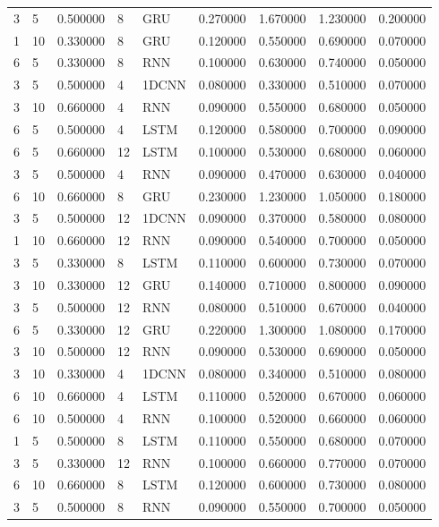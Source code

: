 \begin{tabular}{llrllrrrr}
3 & 5 & 0.500000 & 8 & GRU & 0.270000 & 1.670000 & 1.230000 & 0.200000 \\
1 & 10 & 0.330000 & 8 & GRU & 0.120000 & 0.550000 & 0.690000 & 0.070000 \\
6 & 5 & 0.330000 & 8 & RNN & 0.100000 & 0.630000 & 0.740000 & 0.050000 \\
3 & 5 & 0.500000 & 4 & 1DCNN & 0.080000 & 0.330000 & 0.510000 & 0.070000 \\
3 & 10 & 0.660000 & 4 & RNN & 0.090000 & 0.550000 & 0.680000 & 0.050000 \\
6 & 5 & 0.500000 & 4 & LSTM & 0.120000 & 0.580000 & 0.700000 & 0.090000 \\
6 & 5 & 0.660000 & 12 & LSTM & 0.100000 & 0.530000 & 0.680000 & 0.060000 \\
3 & 5 & 0.500000 & 4 & RNN & 0.090000 & 0.470000 & 0.630000 & 0.040000 \\
6 & 10 & 0.660000 & 8 & GRU & 0.230000 & 1.230000 & 1.050000 & 0.180000 \\
3 & 5 & 0.500000 & 12 & 1DCNN & 0.090000 & 0.370000 & 0.580000 & 0.080000 \\
1 & 10 & 0.660000 & 12 & RNN & 0.090000 & 0.540000 & 0.700000 & 0.050000 \\
3 & 5 & 0.330000 & 8 & LSTM & 0.110000 & 0.600000 & 0.730000 & 0.070000 \\
3 & 10 & 0.330000 & 12 & GRU & 0.140000 & 0.710000 & 0.800000 & 0.090000 \\
3 & 5 & 0.500000 & 12 & RNN & 0.080000 & 0.510000 & 0.670000 & 0.040000 \\
6 & 5 & 0.330000 & 12 & GRU & 0.220000 & 1.300000 & 1.080000 & 0.170000 \\
3 & 10 & 0.500000 & 12 & RNN & 0.090000 & 0.530000 & 0.690000 & 0.050000 \\
3 & 10 & 0.330000 & 4 & 1DCNN & 0.080000 & 0.340000 & 0.510000 & 0.080000 \\
6 & 10 & 0.660000 & 4 & LSTM & 0.110000 & 0.520000 & 0.670000 & 0.060000 \\
6 & 10 & 0.500000 & 4 & RNN & 0.100000 & 0.520000 & 0.660000 & 0.060000 \\
1 & 5 & 0.500000 & 8 & LSTM & 0.110000 & 0.550000 & 0.680000 & 0.070000 \\
3 & 5 & 0.330000 & 12 & RNN & 0.100000 & 0.660000 & 0.770000 & 0.070000 \\
6 & 10 & 0.660000 & 8 & LSTM & 0.120000 & 0.600000 & 0.730000 & 0.080000 \\
3 & 5 & 0.500000 & 8 & RNN & 0.090000 & 0.550000 & 0.700000 & 0.050000 \\

\end{tabular}
